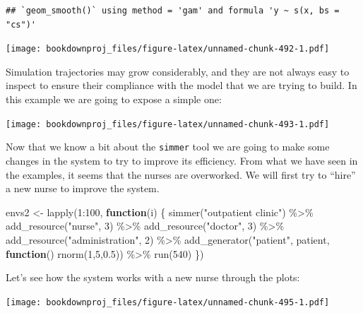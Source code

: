 \documentclass[
]{book}
\newenvironment{Shaded}{\begin{snugshade}}{\end{snugshade}}
\newcommand{\ControlFlowTok}[1]{\textcolor[rgb]{0.13,0.29,0.53}{\textbf{#1}}}
\newcommand{\DecValTok}[1]{\textcolor[rgb]{0.00,0.00,0.81}{#1}}
\newcommand{\FloatTok}[1]{\textcolor[rgb]{0.00,0.00,0.81}{#1}}
\newcommand{\FunctionTok}[1]{\textcolor[rgb]{0.00,0.00,0.00}{#1}}
\newcommand{\NormalTok}[1]{#1}
\newcommand{\OtherTok}[1]{\textcolor[rgb]{0.56,0.35,0.01}{#1}}
\newcommand{\SpecialCharTok}[1]{\textcolor[rgb]{0.00,0.00,0.00}{#1}}
\newcommand{\StringTok}[1]{\textcolor[rgb]{0.31,0.60,0.02}{#1}}
\theoremstyle{definition}
\theoremstyle{definition}
\theoremstyle{definition}
\theoremstyle{definition}
\theoremstyle{remark}
\begin{document}
\begin{verbatim}
## `geom_smooth()` using method = 'gam' and formula 'y ~ s(x, bs = "cs")'
\end{verbatim}

\texttt{[image: bookdownproj\_files/figure-latex/unnamed-chunk-492-1.pdf]}

Simulation trajectories may grow considerably, and they are not always easy to inspect to ensure their compliance with the model that we are trying to build. In this example we are going to expose a simple one:

\texttt{[image: bookdownproj\_files/figure-latex/unnamed-chunk-493-1.pdf]}

Now that we know a bit about the \texttt{simmer} tool we are going to make some changes in the system to try to improve its efficiency. From what we have seen in the examples, it seems that the nurses are overworked. We will first try to ``hire'' a new nurse to improve the system.

\begin{Shaded}
\begin{Highlighting}[]
\NormalTok{envs2 }\OtherTok{\textless{}{-}} \FunctionTok{lapply}\NormalTok{(}\DecValTok{1}\SpecialCharTok{:}\DecValTok{100}\NormalTok{, }\ControlFlowTok{function}\NormalTok{(i) \{}
  \FunctionTok{simmer}\NormalTok{(}\StringTok{"outpatient clinic"}\NormalTok{) }\SpecialCharTok{\%\textgreater{}\%}
    \FunctionTok{add\_resource}\NormalTok{(}\StringTok{"nurse"}\NormalTok{, }\DecValTok{3}\NormalTok{) }\SpecialCharTok{\%\textgreater{}\%}
    \FunctionTok{add\_resource}\NormalTok{(}\StringTok{"doctor"}\NormalTok{, }\DecValTok{3}\NormalTok{) }\SpecialCharTok{\%\textgreater{}\%}
    \FunctionTok{add\_resource}\NormalTok{(}\StringTok{"administration"}\NormalTok{, }\DecValTok{2}\NormalTok{) }\SpecialCharTok{\%\textgreater{}\%}
    \FunctionTok{add\_generator}\NormalTok{(}\StringTok{"patient"}\NormalTok{, patient, }\ControlFlowTok{function}\NormalTok{() }\FunctionTok{rnorm}\NormalTok{(}\DecValTok{1}\NormalTok{,}\DecValTok{5}\NormalTok{,}\FloatTok{0.5}\NormalTok{)) }\SpecialCharTok{\%\textgreater{}\%}
    \FunctionTok{run}\NormalTok{(}\DecValTok{540}\NormalTok{)}
\NormalTok{\})}
\end{Highlighting}
\end{Shaded}

Let's see how the system works with a new nurse through the plots:

\texttt{[image: bookdownproj\_files/figure-latex/unnamed-chunk-495-1.pdf]}
\end{document}
